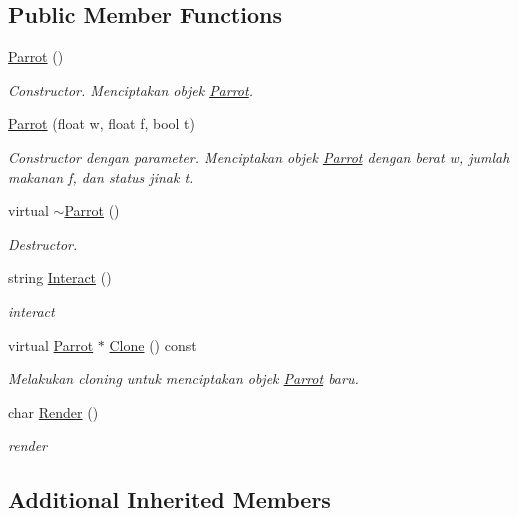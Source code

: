 \subsection*{Public Member Functions}
\begin{DoxyCompactItemize}
\item 
\hyperlink{classParrot_adfd08f638064b09dc46924ded14d1b32}{Parrot} ()
\begin{DoxyCompactList}\small\item\em Constructor. Menciptakan objek \hyperlink{classParrot}{Parrot}. \end{DoxyCompactList}\item 
\hyperlink{classParrot_a98ad57fac6ea488daf92b33c2d8ae57f}{Parrot} (float w, float f, bool t)
\begin{DoxyCompactList}\small\item\em Constructor dengan parameter. Menciptakan objek \hyperlink{classParrot}{Parrot} dengan berat w, jumlah makanan f, dan status jinak t. \end{DoxyCompactList}\item 
virtual \hyperlink{classParrot_a02300897ced64c5a28347d385f4f0f00}{$\sim$\+Parrot} ()
\begin{DoxyCompactList}\small\item\em Destructor. \end{DoxyCompactList}\item 
string \hyperlink{classParrot_a3fdf1aa0851d53d31b5d225d755e4995}{Interact} ()
\begin{DoxyCompactList}\small\item\em interact \end{DoxyCompactList}\item 
virtual \hyperlink{classParrot}{Parrot} $\ast$ \hyperlink{classParrot_aec7fd1385827d67522e1baf3242078b0}{Clone} () const 
\begin{DoxyCompactList}\small\item\em Melakukan cloning untuk menciptakan objek \hyperlink{classParrot}{Parrot} baru. \end{DoxyCompactList}\item 
char \hyperlink{classParrot_a27c491ab4ae56491fbe8d74e494bc46d}{Render} ()
\begin{DoxyCompactList}\small\item\em render \end{DoxyCompactList}\end{DoxyCompactItemize}
\subsection*{Additional Inherited Members}


